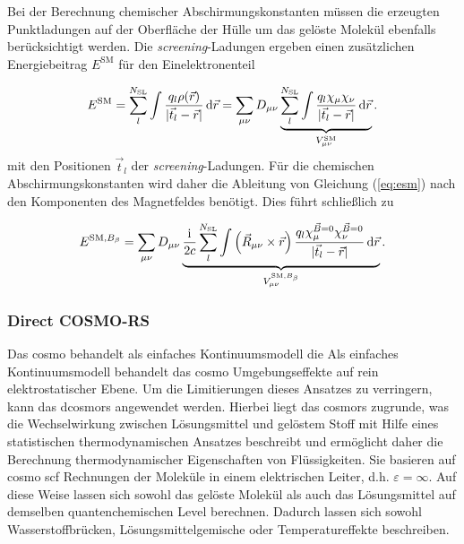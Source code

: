 Bei der Berechnung chemischer Abschirmungskonstanten müssen die erzeugten Punktladungen auf der Oberfläche der Hülle um das gelöste Molekül ebenfalls berücksichtigt werden. Die \textit{screening}-Ladungen ergeben einen zusätzlichen Energiebeitrag $E^{\textrm{SM}}$ für den Einelektronenteil\supercite{cammi1999nuclear}

	\begin{equation}\label{eq:esm}
	E^{\textrm{SM}}=\sum_{l}^{N_{\textrm{SL}}}\int\frac{q_l\rho(\vec{r})}{\vert\vec{t}_l-\vec{r}\vert}\mathop{}\!\mathrm{d}\vec{r}=\sum_{\mu\nu}D_{\mu\nu}\underbrace{\sum_l^{N_{\textrm{SL}}}\int\frac{q_l\chi_\mu\chi_\nu}{\vert\vec{t}_l-\vec{r}\vert}\mathop{}\!\mathrm{d}\vec{r}}_{V_{\mu\nu}^{\textrm{SM}}}.
	\end{equation}
mit den Positionen $\vec{t}_l$ der \textit{screening}-Ladungen. Für die chemischen Abschirmungskonstanten wird daher die Ableitung von Gleichung (\ref{eq:esm}) nach den Komponenten des Magnetfeldes benötigt. Dies führt schließlich zu

	\begin{equation}\label{eq:esmdb}
	E^{\textrm{SM},B_\beta}=\sum_{\mu\nu}D_{\mu\nu}\underbrace{\frac{\mathrm{i}\mkern1mu}{2c}\sum_l^{N_{\textrm{SL}}}\int\left(\vec{R}_{\mu\nu}\times\vec{r}\right)\frac{q_l\chi_\mu^{\vec{B}=0}\chi_\nu^{\vec{B}=0}}{\vert\vec{t}_l-\vec{r}\vert}\mathop{}\!\mathrm{d}\vec{r}}_{V_{\mu\nu}^{\textrm{SM},B_\beta}}.
	\end{equation}
	\subsubsection{Direct COSMO-RS}
	Das \ac{cosmo} behandelt als einfaches Kontinuumsmodell die 
Als einfaches Kontinuumsmodell behandelt das \ac{cosmo} Umgebungseffekte auf rein elektrostatischer Ebene. Um die Limitierungen dieses Ansatzes zu verringern, kann das \ac{dcosmors}\supercite{sinnecker2006calculation,klamt2011cosmo,renz2012reliable} angewendet werden. Hierbei liegt das \ac{cosmors}\supercite{klamt1995conductor,klamt1998refinement} zugrunde, was die Wechselwirkung zwischen Lösungsmittel und gelöstem Stoff mit Hilfe eines statistischen thermodynamischen Ansatzes beschreibt und ermöglicht daher die Berechnung thermodynamischer Eigenschaften von Flüssigkeiten. Sie basieren auf \ac{cosmo} \ac{scf} Rechnungen der Moleküle in einem elektrischen Leiter, d.h. $\varepsilon=\infty$. Auf diese Weise lassen sich sowohl das gelöste Molekül als auch das Lösungsmittel auf demselben quantenchemischen Level berechnen. Dadurch lassen sich sowohl Wasserstoffbrücken, Lösungsmittelgemische oder Temperatureffekte beschreiben.\supercite{renz2012reliable}


